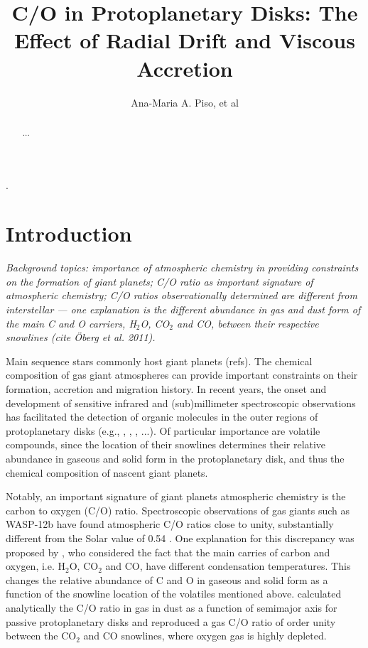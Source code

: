 \documentclass[apj]{emulateapj}
\newcommand{\emgr}[1]{\emph{ \color{gray} #1}}
\begin{document}



\title{C/O in Protoplanetary Disks: The Effect of Radial Drift and Viscous Accretion}

\author{Ana-Maria A. Piso, et al}. %


\begin{abstract}
...
\end{abstract}

\section{Introduction}

\emgr{Background topics: importance of atmospheric chemistry in providing constraints on the formation of giant planets; C/O ratio as important signature of atmospheric chemistry; C/O ratios observationally determined are different from interstellar --- one explanation is the different abundance in gas and dust form of the main C and O carriers, H$_2$O, CO$_2$ and CO, between their respective snowlines (cite \"Oberg et al. 2011).}

Main sequence stars commonly host giant planets (refs). The chemical composition of gas giant atmospheres can provide important constraints on their formation, accretion and migration history. In recent years, the onset and development of sensitive infrared and (sub)millimeter spectroscopic observations has facilitated the detection of organic molecules in the outer regions of protoplanetary disks (e.g., \citealt{oberg10}, \citealt{oberg11b}, \citealt{oberg11c}, ...). Of particular importance are volatile compounds, since the location of their snowlines determines their relative abundance in gaseous and solid form in the protoplanetary disk, and thus the chemical composition of nascent giant planets. 

Notably, an important signature of giant planets atmospheric chemistry is the carbon to oxygen (C/O) ratio. Spectroscopic observations of gas giants such as WASP-12b have found atmospheric C/O ratios close to unity, substantially different from the Solar value of 0.54 \citep{madhu11}. One explanation for this discrepancy was proposed by \citet{oberg11}, who considered the fact that the main carries of carbon and oxygen, i.e. H$_2$O, CO$_2$ and CO, have different condensation temperatures. This changes the relative abundance of C and O in gaseous and solid form as a function of the snowline location of the volatiles mentioned above. \citet{oberg11} calculated analytically the C/O ratio in gas in dust as a function of semimajor axis for passive protoplanetary disks and reproduced a gas C/O ratio of order unity between the CO$_2$ and CO snowlines, where oxygen gas is highly depleted.
\end{document}
